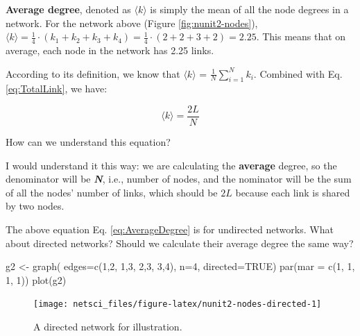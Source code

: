 \documentclass[
]{krantz}
\makeatletter
\newenvironment{Shaded}{\begin{snugshade}}{\end{snugshade}}
\newcommand{\AttributeTok}[1]{\textcolor[rgb]{0.61,0.61,0.61}{#1}}
\newcommand{\ConstantTok}[1]{\textcolor[rgb]{0,0,0}{#1}}
\newcommand{\DecValTok}[1]{\textcolor[rgb]{0.06,0.06,0.06}{#1}}
\newcommand{\FunctionTok}[1]{\textcolor[rgb]{0,0,0}{#1}}
\newcommand{\NormalTok}[1]{#1}
\newcommand{\OtherTok}[1]{\textcolor[rgb]{0.37,0.37,0.37}{#1}}
\newenvironment{kframe}{%
\medskip{}
\setlength{\fboxsep}{.8em}
 \def\at@end@of@kframe{}%
 \ifinner\ifhmode%
  \def\at@end@of@kframe{\end{minipage}}%
  \begin{minipage}{\columnwidth}%
 \fi\fi%
 \def\FrameCommand##1{\hskip\@totalleftmargin \hskip-\fboxsep
 \colorbox{shadecolor}{##1}\hskip-\fboxsep
     \hskip-\linewidth \hskip-\@totalleftmargin \hskip\columnwidth}%
 \MakeFramed {\advance\hsize-\width
   \@totalleftmargin\z@ \linewidth\hsize
   \@setminipage}}%
 {\par\unskip\endMakeFramed%
 \at@end@of@kframe}
\renewenvironment{Shaded}{\begin{kframe}}{\end{kframe}}
\makeatother
\begin{document}
\textbf{Average degree}, denoted as \(\langle k \rangle\) is simply the mean of all the node degrees in a network. For the network above (Figure \ref{fig:nunit2-nodes}), \(\langle k \rangle = \frac{1}{4} \cdot (k_1 + k_2 + k_3 + k_4) = \frac{1}{4} \cdot (2+2+3+2) = 2.25\). This means that on average, each node in the network has 2.25 links.

According to its definition, we know that \(\langle k \rangle\) = \(\frac{1}{N} \sum_{i=1}^N k_i\). Combined with Eq. \eqref{eq:TotalLink}, we have:

\begin{equation} 
  \langle k \rangle = \frac{2L}{N} \label{eq:AverageDegree}
\end{equation}

How can we understand this equation?

I would understand it this way: we are calculating the \textbf{average} degree, so the denominator will be \textbf{\emph{N}}, i.e., number of nodes, and the nominator will be the sum of all the nodes' number of links, which should be \(2L\) because each link is shared by two nodes.

The above equation Eq. \eqref{eq:AverageDegree} is for undirected networks. What about directed networks? Should we calculate their average degree the same way?

\begin{Shaded}
\begin{Highlighting}[]
\NormalTok{g2 }\OtherTok{\textless{}{-}} \FunctionTok{graph}\NormalTok{( }\AttributeTok{edges=}\FunctionTok{c}\NormalTok{(}\DecValTok{1}\NormalTok{,}\DecValTok{2}\NormalTok{, }\DecValTok{1}\NormalTok{,}\DecValTok{3}\NormalTok{, }\DecValTok{2}\NormalTok{,}\DecValTok{3}\NormalTok{, }\DecValTok{3}\NormalTok{,}\DecValTok{4}\NormalTok{), }\AttributeTok{n=}\DecValTok{4}\NormalTok{, }\AttributeTok{directed=}\ConstantTok{TRUE}\NormalTok{)}
\FunctionTok{par}\NormalTok{(}\AttributeTok{mar =} \FunctionTok{c}\NormalTok{(}\DecValTok{1}\NormalTok{, }\DecValTok{1}\NormalTok{, }\DecValTok{1}\NormalTok{, }\DecValTok{1}\NormalTok{))}
\FunctionTok{plot}\NormalTok{(g2)}
\end{Highlighting}
\end{Shaded}

\begin{figure}

{\centering \texttt{[image: netsci\_files/figure-latex/nunit2-nodes-directed-1]} 

}

\caption{A directed network for illustration.}\label{fig:nunit2-nodes-directed}
\end{figure}
\end{document}
